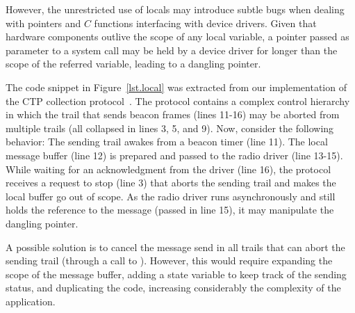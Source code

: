 However, the unrestricted use of locals may introduce subtle bugs when dealing 
with pointers and $C$ functions interfacing with device drivers.
Given that hardware components outlive the scope of any local variable, a 
pointer passed as parameter to a system call may be held by a device driver
for longer than the scope of the referred variable, leading to a dangling 
pointer.

The code snippet in Figure~\ref{lst.local} was extracted from our 
implementation of the CTP collection protocol~\cite{wsn.teps}.
The protocol contains a complex control hierarchy in which the trail that sends 
beacon frames (lines 11-16) may be aborted from multiple  trails 
(all collapsed in lines 3, 5, and 9).
%
Now, consider the following behavior:
The sending trail awakes from a beacon timer (line 11).
The local message buffer (line 12) is prepared and passed to the radio driver 
(line 13-15).
While waiting for an acknowledgment from the driver (line 16), the protocol 
receives a request to stop (line 3) that aborts the sending trail and makes the 
local buffer go out of scope.
As the radio driver runs asynchronously and still holds the reference to the 
message (passed in line 15), it may manipulate the dangling pointer.
%

%
A possible solution is to cancel the message send in all trails that can abort 
the sending trail (through a call to ).
However, this would require expanding the scope of the message buffer, adding a 
state variable to keep track of the sending status, and duplicating the code, 
increasing considerably the complexity of the application.

